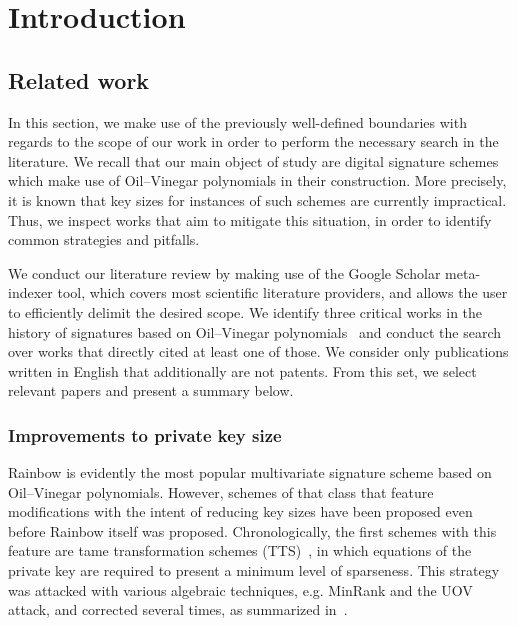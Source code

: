 \documentclass[draft, 12pt, a4paper, oneside]{memoir}
\theoremstyle{definition}
\begin{document}
\tableofcontents*

\chapter{Introduction}\label{chapter:intro}


\section{Related work}\label{sec:related}

In this section, we make use of the previously well-defined boundaries with regards to the scope of our work in order to perform the necessary search in the literature. We recall that our main object of study are digital signature schemes which make use of Oil--Vinegar polynomials in their construction. More precisely, it is known that key sizes for instances of such schemes are currently impractical. Thus, we inspect works that aim to mitigate this situation, in order to identify common strategies and pitfalls.

We conduct our literature review by making use of the Google Scholar meta-indexer tool, which covers most scientific literature providers, and allows the user to efficiently delimit the desired scope. We identify three critical works in the history of signatures based on Oil--Vinegar polynomials~\cite{Patarin:199709,Kipnis:199904,Ding:200506} and conduct the search over works that directly cited at least one of those. We consider only publications written in English that additionally are not patents. From this set, we select relevant papers and present a summary below.

\subsection{Improvements to private key size}\label{subsec:priv}

Rainbow is evidently the most popular multivariate signature scheme based on Oil--Vinegar polynomials. However, schemes of that class that feature modifications with the intent of reducing key sizes have been proposed even before Rainbow itself was proposed. Chronologically, the first schemes with this feature are tame transformation schemes (TTS)~\cite{Chen:200210}, in which equations of the private key are required to present a minimum level of sparseness. This strategy was attacked with various algebraic techniques, e.g. MinRank and the UOV attack, and corrected several times, as summarized in~\cite{Ding:200604}.
\end{document}
